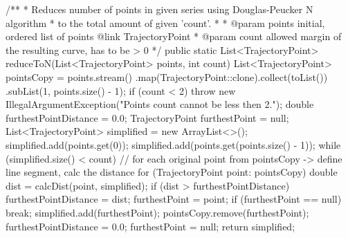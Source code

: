 /**
 * Reduces number of points in given series using Douglas-Peucker N algorithm 
 * to the total amount of given 'count'.
 *
 * @param points    initial, ordered list of points {@link TrajectoryPoint}
 * @param count     allowed margin of the resulting curve, has to be > 0
 */
public static List<TrajectoryPoint> reduceToN(List<TrajectoryPoint> points, int count) {
    List<TrajectoryPoint> pointsCopy = points.stream()
            .map(TrajectoryPoint::clone).collect(toList())
            .subList(1, points.size() - 1);
    if (count < 2) {
        throw new IllegalArgumentException("Points count cannot be less then 2.");
    }
    double furthestPointDistance = 0.0;
    TrajectoryPoint furthestPoint = null;
    List<TrajectoryPoint> simplified = new ArrayList<>();
    simplified.add(points.get(0));
    simplified.add(points.get(points.size() - 1));
    while (simplified.size() < count) {
//        for each original point from pointsCopy -> define line segment, calc the distance
        for (TrajectoryPoint point: pointsCopy) {
            double dist = calcDist(point, simplified);
            if (dist > furthestPointDistance) {
                furthestPointDistance = dist;
                furthestPoint = point;
            }
        }
        if (furthestPoint == null)
            break;
        simplified.add(furthestPoint);
        pointsCopy.remove(furthestPoint);
        furthestPointDistance = 0.0;
        furthestPoint = null;
    }
    return simplified;
}